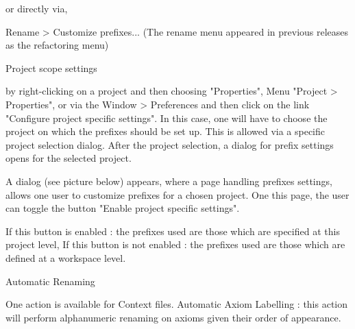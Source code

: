 or directly via,

    Rename > Customize prefixes... (The rename menu appeared in previous releases as the refactoring menu) 


Project scope settings

    by right-clicking on a project and then choosing "Properties",
    Menu "Project > Properties",
    or via the Window > Preferences and then click on the link "Configure project specific settings". In this case, one will have to choose the project on which the prefixes should be set up. This is allowed via a specific project selection dialog. After the project selection, a dialog for prefix settings opens for the selected project. 

A dialog (see picture below) appears, where a page handling prefixes settings, allows one user to customize prefixes for a chosen project. One this page, the user can toggle the button "Enable project specific settings".

    If this button is enabled :
        the prefixes used are those which are specified at this project level, 
    If this button is not enabled :
        the prefixes used are those which are defined at a workspace level. 


Automatic Renaming

    One action is available for Context files.
        Automatic Axiom Labelling : this action will perform alphanumeric renaming on axioms given their order of appearance.
 


